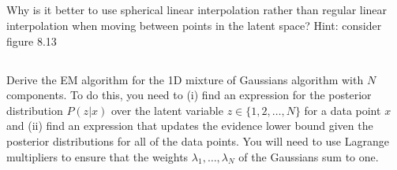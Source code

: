 \documentclass[12pt]{report}
\begin{document}
\subsection{}
\begin{mdframed}
    Why is it better to use spherical linear interpolation rather than regular linear interpolation when moving between points in the latent space? Hint: consider figure 8.13
\end{mdframed}

\subsection{}
\begin{mdframed}
    Derive the EM algorithm for the 1D mixture of Gaussians algorithm with $N$ components. To do this, you need to (i) find an expression for the posterior distribution $P(z|x)$ over the latent variable $z \in \{1, 2, \dots , N\}$ for a data point $x$ and (ii) find an expression that updates the evidence lower bound given the posterior distributions for all of the data points. You will need to use Lagrange multipliers to ensure that the weights $\lambda_{1}, \dots, \lambda_{N}$ of the Gaussians sum to one.
\end{mdframed}
\end{document}
